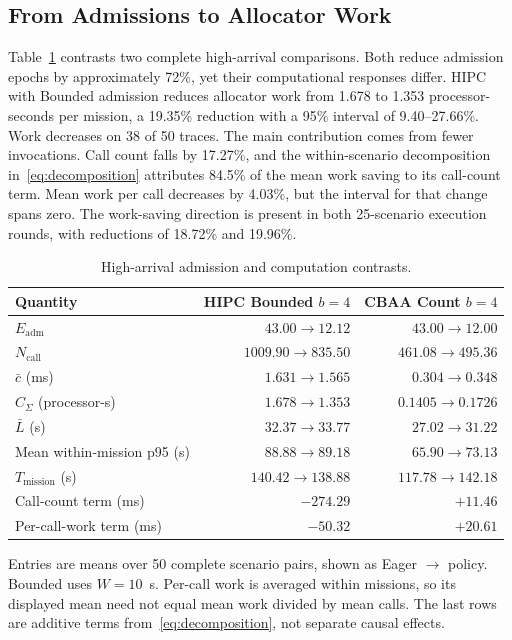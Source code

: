 \documentclass[conference]{IEEEtran}
\begin{document}
\subsection{From Admissions to Allocator Work}
\label{sec:mechanism_results}
Table~\ref{tab:mechanism} contrasts two complete high-arrival comparisons. Both reduce admission epochs by approximately 72\%, yet their computational responses differ. HIPC with Bounded admission reduces allocator work from 1.678 to 1.353 processor-seconds per mission, a 19.35\% reduction with a 95\% interval of 9.40--27.66\%. Work decreases on 38 of 50 traces. The main contribution comes from fewer invocations. Call count falls by 17.27\%, and the within-scenario decomposition in~\eqref{eq:decomposition} attributes 84.5\% of the mean work saving to its call-count term. Mean work per call decreases by 4.03\%, but the interval for that change spans zero. The work-saving direction is present in both 25-scenario execution rounds, with reductions of 18.72\% and 19.96\%.

\begin{table}[t]
\caption{High-arrival admission and computation contrasts.}
\label{tab:mechanism}
\centering
\footnotesize
\setlength{\tabcolsep}{3.4pt}
\renewcommand{\arraystretch}{1.08}
\begin{tabular}{@{}lrr@{}}
\toprule
Quantity & \shortstack{HIPC\\Bounded $b=4$} & \shortstack{CBAA\\Count $b=4$}\\
\midrule
$E_{\mathrm{adm}}$ & $43.00\to12.12$ & $43.00\to12.00$\\
$N_{\mathrm{call}}$ & $1009.90\to835.50$ & $461.08\to495.36$\\
$\bar c$ (ms) & $1.631\to1.565$ & $0.304\to0.348$\\
$C_\Sigma$ (processor-s) & $1.678\to1.353$ & $0.1405\to0.1726$\\
$\bar L$ (s) & $32.37\to33.77$ & $27.02\to31.22$\\
Mean within-mission p95 (s) & $88.88\to89.18$ & $65.90\to73.13$\\
$T_{\mathrm{mission}}$ (s) & $140.42\to138.88$ & $117.78\to142.18$\\
\midrule
Call-count term (ms) & $-274.29$ & $+11.46$\\
Per-call-work term (ms) & $-50.32$ & $+20.61$\\
\bottomrule
\end{tabular}\par
\vspace{3pt}
\noindent\parbox{\columnwidth}{\footnotesize Entries are means over 50 complete scenario pairs, shown as Eager $\to$ policy. Bounded uses $W=10$~s. Per-call work is averaged within missions, so its displayed mean need not equal mean work divided by mean calls. The last rows are additive terms from~\eqref{eq:decomposition}, not separate causal effects.}
\end{table}
\end{document}

